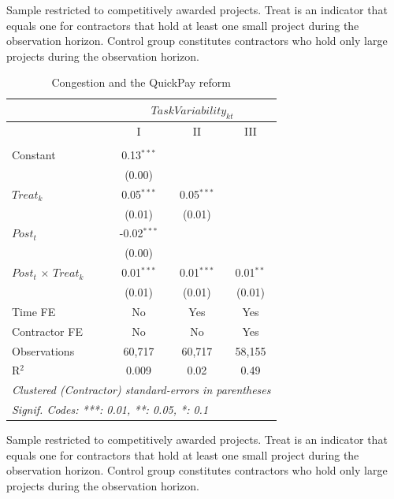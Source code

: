 \documentclass[
]{article}
\begin{document}
\begin{table}[htbp]
   \par \raggedright 
   Sample restricted to competitively awarded projects. Treat is an indicator that equals one for contractors that hold at least one small project during the observation horizon. Control group constitutes contractors who hold only large projects during the observation horizon.
\end{table}
\begin{table}[htbp]
   \caption{Congestion and the QuickPay reform}
   \centering
   \tiny
   \begin{tabular}{lccc}
      \toprule
      \midrule  & \multicolumn{3}{c}{$TaskVariability_{kt}$}\\
      \midrule  & I & II & III\\
      \midrule \\
      Constant                     & 0.13$^{***}$  &              &   \\   
                                   & (0.00)        &              &   \\   
      $Treat_k$                    & 0.05$^{***}$  & 0.05$^{***}$ &   \\   
                                   & (0.01)        & (0.01)       &   \\   
      $Post_t$                     & -0.02$^{***}$ &              &   \\   
                                   & (0.00)        &              &   \\   
      $Post_t$ $\times$ $Treat_k$  & 0.01$^{***}$  & 0.01$^{***}$ & 0.01$^{**}$\\   
                                   & (0.01)        & (0.01)       & (0.01)\\   
      \midrule 
      Time FE                      & No            & Yes          & Yes\\  
      Contractor FE                & No            & No           & Yes\\  
      Observations                 & 60,717        & 60,717       & 58,155\\  
      R$^2$                        & 0.009         & 0.02         & 0.49\\  
      \midrule
      \multicolumn{4}{l}{\emph{Clustered (Contractor) standard-errors in parentheses}}\\
      \multicolumn{4}{l}{\emph{Signif. Codes: ***: 0.01, **: 0.05, *: 0.1}}\\
   \end{tabular}
   
   \par \raggedright 
   Sample restricted to competitively awarded projects. Treat is an indicator that equals one for contractors that hold at least one small project during the observation horizon. Control group constitutes contractors who hold only large projects during the observation horizon.
\end{table}
\end{document}
